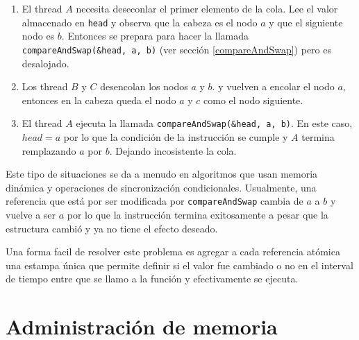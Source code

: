 \begin{enumerate}
	\item El thread $A$ necesita deseconlar el primer elemento de la cola. Lee el valor almacenado en \texttt{head} y  observa que la cabeza es el nodo $a$ y que el siguiente nodo es $b$. Entonces se prepara para hacer la llamada \texttt{compareAndSwap(\&head, a, b)} (ver sección \ref{compareAndSwap}) pero es desalojado.
	\item Los thread $B$ y $C$ desencolan los nodos $a$ y $b$. y vuelven a encolar el nodo $a$, entonces en la cabeza queda el nodo $a$ y $c$ como el nodo siguiente.
	\item El thread $A$ ejecuta la llamada  \texttt{compareAndSwap(\&head, a, b)}. En este caso, $head = a$ por lo que la condición de la instrucción se cumple y $A$ termina remplazando $a$ por $b$. Dejando incosistente la cola.
\end{enumerate}

Este tipo de situaciones se da a menudo en algoritmos que usan memoria dinámica y operaciones de sincronización  condicionales. Usualmente, una referencia que está por ser modificada por \texttt{compareAndSwap} cambia de $a$ a $b$ y vuelve a ser $a$ por lo que la instrucción termina exitosamente a pesar que la estructura cambió y ya no tiene el efecto deseado.

Una forma facil de resolver este problema es agregar a cada referencia atómica una estampa única que permite definir si el valor fue cambiado o no en el interval de tiempo entre que se llamo a la función y efectivamente se ejecuta.

\printbibliography[keyword=progConcurr,title=Bibliografía]

\newpage
\section{Administración de memoria}
\subsection{}
\subsection{}
\subsection{}
\subsection{}
